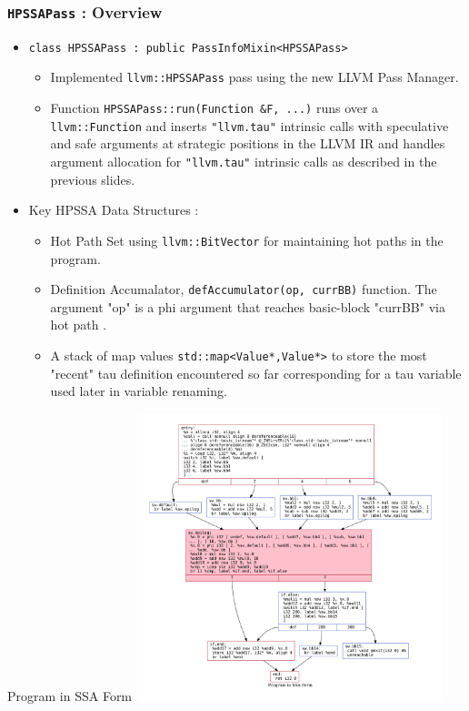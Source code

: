\documentclass[aspectratio=169, compress]{beamer}
\begin{document}
\begin{frame}
	\frametitle{\texttt{HPSSAPass} : Overview}
	\begin{itemize}
		\item \texttt{class HPSSAPass : public PassInfoMixin<HPSSAPass>}
		\begin{itemize}
			\footnotesize
			\item Implemented \texttt{llvm::HPSSAPass} pass using the new LLVM Pass Manager. 
			\item Function \texttt{HPSSAPass::run(Function &F, ...)}  runs over a \texttt{llvm::Function} and inserts \texttt{"llvm.tau"} intrinsic calls with speculative and safe arguments at strategic positions in the LLVM IR and handles argument allocation for  \texttt{"llvm.tau"} intrinsic calls as described in the previous slides. \pause
		\end{itemize}
		\item Key HPSSA Data Structures :  \pause
		\begin{itemize}
			\footnotesize
			\item Hot Path Set using \texttt{llvm::BitVector} for maintaining \color{red} hot paths \color{black} in the program. \pause
			\item Definition Accumalator, \texttt{defAccumulator(op, currBB)} function. %
			The argument "op" is a phi argument that reaches basic-block "currBB" via \color{red} hot path \color{black}. \pause
			\item A stack of map values \texttt{std::map<Value*,Value*>} to store the most "recent" tau definition encountered so far corresponding for a tau variable used later in variable renaming. 
		\end{itemize}
	\end{itemize}
\end{frame}

\begin{frame}{Program in SSA Form}
	\centering
	\includegraphics[width=9cm, height=8.35cm]{dotfiles/baseline.dot.pdf}
\end{frame}
\end{document}
